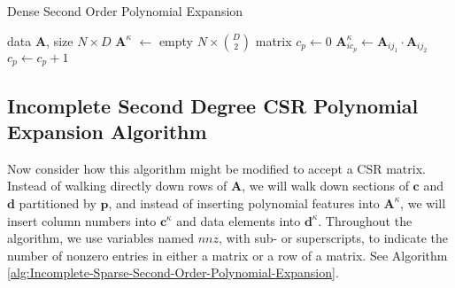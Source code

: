 \documentclass[journal]{journal}
\begin{document}
\begin{algorithm}%
   \caption{Dense Second Order Polynomial Expansion}
   \label{alg:Dense-Second-Order-Polynomial-Expansion}
\begin{algorithmic}[1]
    data $\bm{A}$, size $N \times D$
   \STATE $\bm{A}^\kappa$ $\gets$ empty $N \times \binom{D}{2}$ matrix
      \STATE $c_p \gets 0$
              \STATE $\bm{A}^\kappa_{i{c_p}} \gets \bm{A}_{ij_1} \cdot \bm{A}_{ij_2}$
              \STATE $c_p \gets c_p + 1$
          \ENDFOR
      \ENDFOR
   \ENDFOR
\end{algorithmic}
\end{algorithm}


\subsection{Incomplete Second Degree CSR Polynomial Expansion Algorithm}
\label{sec:final-algo}
Now consider how this algorithm might be modified to accept a CSR matrix.
Instead of walking directly down rows of $\bm{A}$, we will walk down sections of $\bm{c}$ and $\bm{d}$ partitioned by $\bm{p}$, and instead of inserting polynomial features into $\bm{A}^\kappa$, we will insert column numbers into $\bm{c}^\kappa$ and data elements into $\bm{d}^\kappa$.
Throughout the algorithm, we use variables named $nnz$, with sub- or superscripts, to indicate the number of nonzero entries in either a matrix or a row of a matrix. 
See Algorithm \ref{alg:Incomplete-Sparse-Second-Order-Polynomial-Expansion}.

\end{document}
